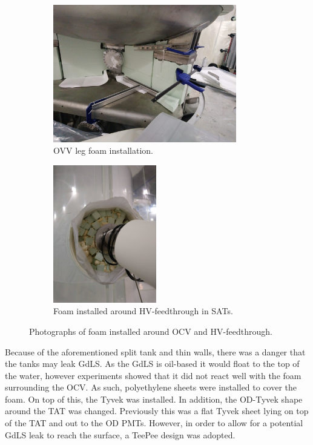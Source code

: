 \begin{figure}[!htbp]
\begin{subfigure}{.5\textwidth}
  \centering
  \includegraphics[height=6cm, width=\linewidth]{Figures/Construction/BAT_green_foam.JPG}
  \caption{OVV leg foam installation.}
  \label{fig:ocv_leg_foam}
  \end{subfigure}
  \begin{subfigure}{.5\textwidth}
  \centering
  \includegraphics[height=6cm, width=\linewidth]{Figures/Construction/HV_foam.jpg}
  \caption{Foam installed around HV-feedthrough in SATs.}
  \label{fig:hv_port_foam}
  \end{subfigure}
\caption{Photographs of foam installed around OCV and HV-feedthrough.}
\label{fig:Additional_foam_installation}
\end{figure}

\par
Because of the aforementioned split tank and thin walls, there was a danger that the tanks may leak GdLS.
As the GdLS is oil-based it would float to the top of the water, however experiments showed that it did not react well with the foam surrounding the OCV.
As such, polyethylene sheets were installed to cover the foam. 
On top of this, the Tyvek was installed.
In addition, the OD-Tyvek shape around the TAT was changed.
Previously this was a flat Tyvek sheet lying on top of the TAT and out to the OD PMTs.
However, in order to allow for a potential GdLS leak to reach the surface, a TeePee design was adopted.



